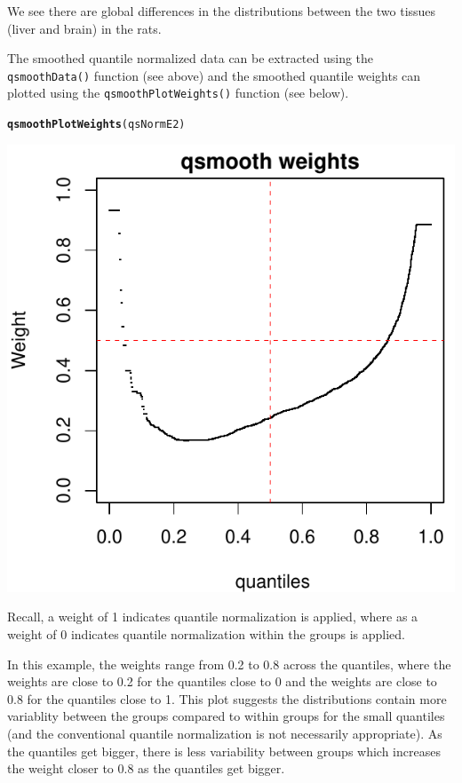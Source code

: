 \documentclass{article}\usepackage[]{graphicx}\usepackage[usenames,dvipsnames]{color}
\makeatletter
\def\maxwidth{ %
  \ifdim\Gin@nat@width>\linewidth
    \linewidth
  \else
    \Gin@nat@width
  \fi
}
\newcommand{\hlstd}[1]{\textcolor[rgb]{0.345,0.345,0.345}{#1}}%
\newcommand{\hlkwd}[1]{\textcolor[rgb]{0.737,0.353,0.396}{\textbf{#1}}}%
\newenvironment{kframe}{%
 \def\at@end@of@kframe{}%
 \ifinner\ifhmode%
  \def\at@end@of@kframe{\end{minipage}}%
  \begin{minipage}{\columnwidth}%
 \fi\fi%
 \def\FrameCommand##1{\hskip\@totalleftmargin \hskip-\fboxsep
 \colorbox{shadecolor}{##1}\hskip-\fboxsep
     \hskip-\linewidth \hskip-\@totalleftmargin \hskip\columnwidth}%
 \MakeFramed {\advance\hsize-\width
   \@totalleftmargin\z@ \linewidth\hsize
   \@setminipage}}%
 {\par\unskip\endMakeFramed%
 \at@end@of@kframe}
\newenvironment{knitrout}{}{} %
\makeatother
\begin{document}
We see there are global differences in the distributions between the 
two tissues (liver and brain) in the rats. 

The smoothed quantile normalized data can be extracted using the 
\texttt{qsmoothData()} function (see above) and the smoothed quantile weights 
can plotted using the \texttt{qsmoothPlotWeights()} function (see below). 

\begin{knitrout}
\color{fgcolor}\begin{kframe}
\begin{alltt}
\hlkwd{qsmoothPlotWeights}\hlstd{(qsNormE2)}
\end{alltt}
\end{kframe}
\includegraphics[width=\maxwidth]{figure/plot-qsmooth2-weights-1} 

\end{knitrout}

Recall, a weight of 1 indicates quantile normalization is applied,
where as a weight of 0 indicates quantile normalization
within the groups is applied. 

In this example, the weights range from 0.2 to 0.8 across the quantiles, 
where the weights are close to 0.2 for the quantiles close to 0 and the 
weights are close to 0.8 for the quantiles close to 1. 
This plot suggests the distributions contain more variablity between
the groups compared to within groups for the small quantiles (and 
the conventional quantile normalization is not necessarily appropriate). 
As the quantiles get bigger, there is less variability between groups which 
increases the weight closer to 0.8 as the quantiles get bigger. 
\end{document}
